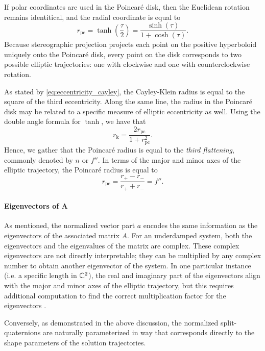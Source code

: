 If polar coordinates are used in the Poincaré disk, then the Euclidean rotation remains identitical, and the radial coordinate is equal to
\begin{equation} 
    r_\text{pc} = \tanh(\frac{\tau}{2}) = \frac{\sinh(\tau)}{1 + \cosh(\tau)}. 
\end{equation}
Because stereographic projection projects each point on the positive hyperboloid uniquely onto the Poincaré disk, every point on the disk corresponds to two possible elliptic trajectories: one with clockwise and one with counterclockwise rotation.

As stated by \cref{eq:eccentricity_cayley}, the Cayley-Klein radius is equal to the square of the third eccentricity. Along the same line, the radius in the Poincaré disk may be related to a specific measure of elliptic eccentricity as well. Using the double angle formula for $ \tanh $, we have that
$$ r_\text{k} = \frac{2r_\text{pc}}{1 + r_\text{pc}^2}. $$
Hence, we gather that the Poincaré radius is equal to the \emph{third flattening}, commonly denoted by $n$ or $f''$. In terms of the major and minor axes of the elliptic trajectory, the Poincaré radius is equal to
$$ r_\text{pc} = \frac{r_+ - r_-}{r_+ + r_-} = f''.$$

\paragraph{Eigenvectors of A} As mentioned, the normalized vector part $a$ encodes the same information as the eigenvectors of the associated matrix $A$. For an underdamped system, both the eigenvectors and the eigenvalues of the matrix are complex. These complex eigenvectors are not directly interpretable; they can be multiplied by any complex number to obtain another eigenvector of the system. In one particular instance (i.e. a specific length in $\mathbb{C}^2$), the real and imaginary part of the eigenvectors align with the major and minor axes of the elliptic trajectory, but this requires additional computation to find the correct multiplication factor for the eigenvectors \cite{Edwards2018}. 

Conversely, as demonstrated in the above discussion, the normalized split-quaternions are naturally parameterized in way that corresponds directly to the shape parameters of the solution trajectories.

